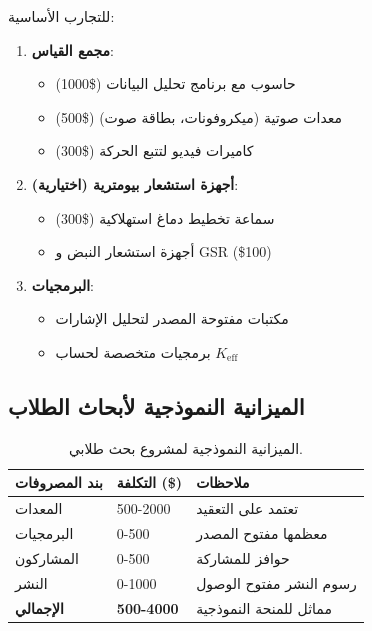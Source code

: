 \documentclass[12pt,a4paper]{article}
\begin{document}
	للتجارب الأساسية:
	\begin{enumerate}
		\item \textbf{مجمع القياس}:
		\begin{itemize}
			\item حاسوب مع برنامج تحليل البيانات (\$1000)
			\item معدات صوتية (ميكروفونات، بطاقة صوت) (\$500)
			\item كاميرات فيديو لتتبع الحركة (\$300)
		\end{itemize}
		
		\item \textbf{أجهزة استشعار بيومترية (اختيارية)}:
		\begin{itemize}
			\item سماعة تخطيط دماغ استهلاكية (\$300)
			\item أجهزة استشعار النبض و GSR (\$100)
		\end{itemize}
		
		\item \textbf{البرمجيات}:
		\begin{itemize}
			\item مكتبات مفتوحة المصدر لتحليل الإشارات
			\item برمجيات متخصصة لحساب $K_{\mathrm{eff}}$
		\end{itemize}
	\end{enumerate}
	
	\subsection{الميزانية النموذجية لأبحاث الطلاب}
	
	\begin{table}[h]
		\centering
		\begin{tabular}{p{}p{}p{}}
			\toprule
			\textbf{بند المصروفات} & \textbf{التكلفة (\$)} & \textbf{ملاحظات} \\
			\midrule
			المعدات & 500-2000 & تعتمد على التعقيد \\
			البرمجيات & 0-500 & معظمها مفتوح المصدر \\
			المشاركون & 0-500 & حوافز للمشاركة \\
			النشر & 0-1000 & رسوم النشر مفتوح الوصول \\
			\midrule
			\textbf{الإجمالي} & \textbf{500-4000} & مماثل للمنحة النموذجية \\
			\bottomrule
		\end{tabular}
		\caption{الميزانية النموذجية لمشروع بحث طلابي.}
		\label{tab:student-budget}
	\end{table}
	
\end{document}
